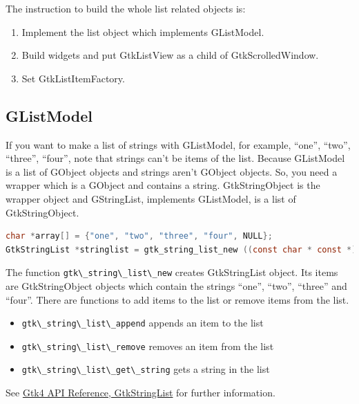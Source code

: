 The instruction to build the whole list related objects is:

\begin{enumerate}
\def\labelenumi{\arabic{enumi}.}
\tightlist
\item
  Implement the list object which implements GListModel.
\item
  Build widgets and put GtkListView as a child of GtkScrolledWindow.
\item
  Set GtkListItemFactory.
\end{enumerate}

\hypertarget{glistmodel}{%
\subsection{GListModel}\label{glistmodel}}

If you want to make a list of strings with GListModel, for example,
``one'', ``two'', ``three'', ``four'', note that strings can't be items
of the list. Because GListModel is a list of GObject objects and strings
aren't GObject objects. So, you need a wrapper which is a GObject and
contains a string. GtkStringObject is the wrapper object and
GStringList, implements GListModel, is a list of GtkStringObject.

\begin{lstlisting}[language=C]
char *array[] = {"one", "two", "three", "four", NULL};
GtkStringList *stringlist = gtk_string_list_new ((const char * const *) array);
\end{lstlisting}

The function \passthrough{\lstinline!gtk\_string\_list\_new!} creates
GtkStringList object. Its items are GtkStringObject objects which
contain the strings ``one'', ``two'', ``three'' and ``four''. There are
functions to add items to the list or remove items from the list.

\begin{itemize}
\tightlist
\item
  \passthrough{\lstinline!gtk\_string\_list\_append!} appends an item to
  the list
\item
  \passthrough{\lstinline!gtk\_string\_list\_remove!} removes an item
  from the list
\item
  \passthrough{\lstinline!gtk\_string\_list\_get\_string!} gets a string
  in the list
\end{itemize}

See \href{https://docs.gtk.org/gtk4/class.StringList.html}{Gtk4 API
Reference, GtkStringList} for further information.

